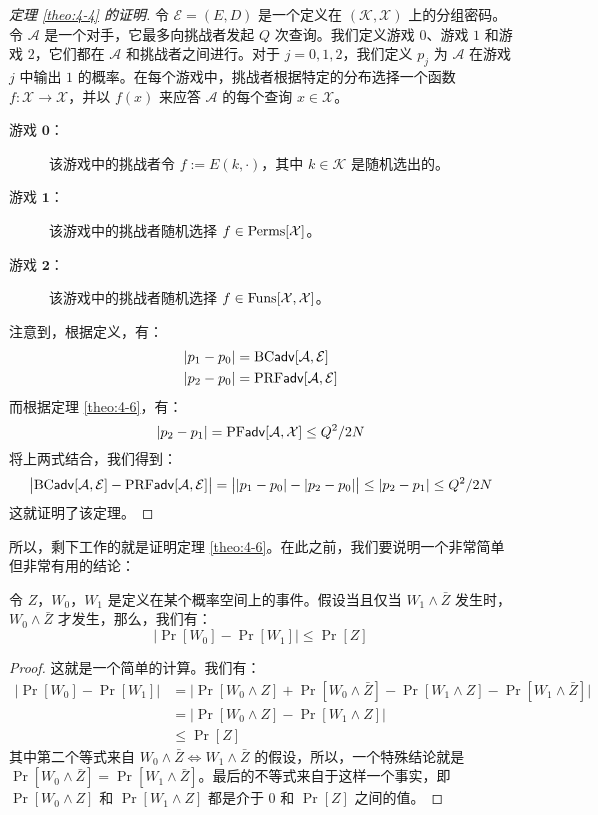 \begin{proof}[定理 \ref{theo:4-4} 的证明]
令 $\mathcal{E}=(E,D)$ 是一个定义在 $(\mathcal{K},\mathcal{X})$ 上的分组密码。令 $\mathcal{A}$ 是一个对手，它最多向挑战者发起 $Q$ 次查询。我们定义游戏 $0$、游戏 $1$ 和游戏 $2$，它们都在 $\mathcal{A}$ 和挑战者之间进行。对于 $j=0,1,2$，我们定义 $p_j$ 为 $\mathcal{A}$ 在游戏 $j$ 中输出 $1$ 的概率。在每个游戏中，挑战者根据特定的分布选择一个函数 $f:\mathcal{X}\to\mathcal{X}$，并以 $f(x)$ 来应答 $\mathcal{A}$ 的每个查询 $x\in\mathcal{X}$。
\begin{description}
	\item [游戏 $\mathbf{0}$：]该游戏中的挑战者令 $f:=E(k,\cdot)$，其中 $k\in\mathcal{K}$ 是随机选出的。
	\item [游戏 $\mathbf{1}$：]该游戏中的挑战者随机选择 $f\in{\rm Perms}[\mathcal{X}]$。
	\item [游戏 $\mathbf{2}$：]该游戏中的挑战者随机选择 $f\in{\rm Funs}[\mathcal{X},\mathcal{X}]$。
\end{description}

注意到，根据定义，有：
\[
\begin{aligned}
	& |p_1-p_0| = {\rm BC\mathsf{adv}}[\mathcal{A},\mathcal{E}]\\
	& |p_2-p_0| = {\rm PRF\mathsf{adv}}[\mathcal{A},\mathcal{E}]
\end{aligned}
\]
而根据定理 \ref{theo:4-6}，有：
\[
|p_2-p_1|={\rm PF\mathsf{adv}}[\mathcal{A},\mathcal{X}]\leq{Q^2}/{2N}
\]
将上两式结合，我们得到：
\[
\big\lvert
{\rm BC\mathsf{adv}}[\mathcal{A},\mathcal{E}]-{\rm PRF\mathsf{adv}}[\mathcal{A},\mathcal{E}]
\big\rvert
=
\big\lvert
|p_1-p_0|-|p_2-p_0|
\big\rvert
\leq|p_2-p_1|\leq{Q^2}/{2N}
\]
这就证明了该定理。
\end{proof}

所以，剩下工作的就是证明定理 \ref{theo:4-6}。在此之前，我们要说明一个非常简单但非常有用的结论：

\begin{theorem}[差分引理]\label{theo:4-7}
令 $Z$，$W_0$，$W_1$ 是定义在某个概率空间上的事件。假设当且仅当 $W_1\land\bar Z$ 发生时，$W_0\land\bar Z$ 才发生，那么，我们有：
\[
\big\lvert
\Pr[W_0]-\Pr[W_1]
\big\rvert
\leq\Pr[Z]
\]
\end{theorem}

\begin{proof}
这就是一个简单的计算。我们有：
\[
\begin{aligned}
\big\lvert\Pr[W_0]-\Pr[W_1]\big\rvert
&=\big\lvert\Pr[W_0\land Z]+\Pr[W_0\land\bar Z]-\Pr[W_1\land Z]-\Pr[W_1\land\bar Z]\big\rvert\\
&=\big\lvert\Pr[W_0\land Z]-\Pr[W_1\land Z]\big\rvert\\
&\leq\Pr[Z]
\end{aligned}
\]
其中第二个等式来自 $W_0\land\bar{Z} \Longleftrightarrow W_1\land\bar{Z}$ 的假设，所以，一个特殊结论就是 $\Pr[W_0\land\bar{Z}]=\Pr[W_1\land\bar{Z}]$。最后的不等式来自于这样一个事实，即 $\Pr[W_0\land Z]$ 和 $\Pr[W_1\land Z]$ 都是介于 $0$ 和 $\Pr[Z]$ 之间的值。
\end{proof}
 
